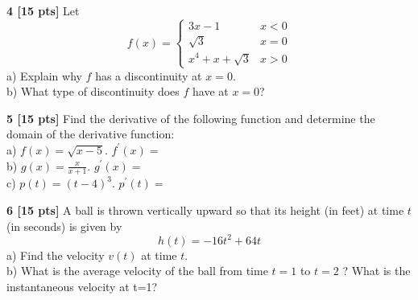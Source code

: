 \documentclass[12pt]{article}
\begin{document}
\vspace{.15in}
\noindent
{\bf 4 [15 pts]} Let $$f(x)=\left\{
\begin{array}{ll}
3x-1 & x<0\\
\sqrt{3} & x=0\\
x^4+x+\sqrt{3} &x>0
\end{array}\right.
$$
a) Explain why $f$ has a discontinuity at $x=0$.
\\
b) What type of discontinuity does $f$ have at $x=0$?

\newpage
\vspace{.15in}
\noindent
{\bf 5 [15 pts]} Find the derivative of the following function and determine the
domain of the derivative function:
\\ 
a) $\displaystyle{f(x) = \sqrt{x-5} } $. $\displaystyle{f^\prime(x) = }$
\\ %
b) $\displaystyle{g(x) = \frac{x}{x+1}}$.
$\displaystyle{g^\prime(x) = }$
\\ %
c) $\displaystyle{p(t) = (t-4)^3}$. $\displaystyle{p^\prime(t) = }$


\vspace{.15in}
\noindent
{\bf 6 [15 pts]} A ball is thrown vertically upward so that its height (in feet) at time $t$ (in seconds) is given by 
$$
 h(t) = -16 t^2+64t$$
a) Find the velocity $v(t)$ at time $t$.
\\
b) What is the average velocity of the ball from time $t=1$
to $t=2$ ? What is the instantaneous velocity at t=1?
\end{document}
